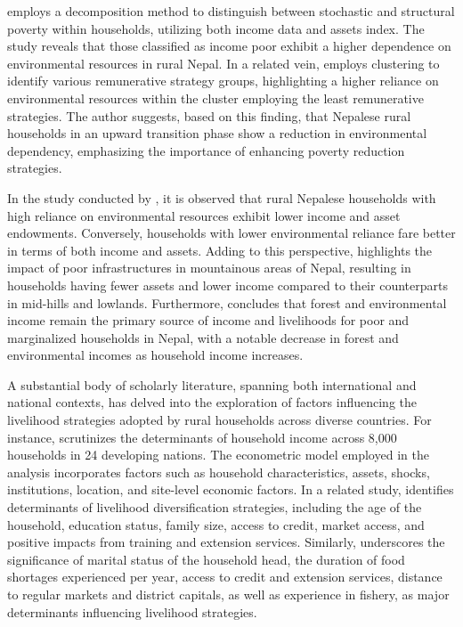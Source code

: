 \cite{charlery2015assessing} employs a decomposition method to distinguish between stochastic and structural poverty within households, utilizing both income data and assets index. The study reveals that those classified as income poor exhibit a higher dependence on environmental resources in rural Nepal. In a related vein, \cite{walelign2017dynamics} employs clustering to identify various remunerative strategy groups, highlighting a higher reliance on environmental resources within the cluster employing the least remunerative strategies. The author suggests, based on this finding, that Nepalese rural households in an upward transition phase show a reduction in environmental dependency, emphasizing the importance of enhancing poverty reduction strategies. 

In the study conducted by \cite{walelign2020environmental}, it is observed that rural Nepalese households with high reliance on environmental resources exhibit lower income and asset endowments. Conversely, households with lower environmental reliance fare better in terms of both income and assets. Adding to this perspective, \cite{walelign2021poverty} highlights the impact of poor infrastructures in mountainous areas of Nepal, resulting in households having fewer assets and lower income compared to their counterparts in mid-hills and lowlands. Furthermore, \cite{chhetri2022importance} concludes that forest and environmental income remain the primary source of income and livelihoods for poor and marginalized households in Nepal, with a notable decrease in forest and environmental incomes as household income increases.

A substantial body of scholarly literature, spanning both international and national contexts, has delved into the exploration of factors influencing the livelihood strategies adopted by rural households across diverse countries. For instance, \cite{angelsen2014environmental} scrutinizes the determinants of household income across 8,000 households in 24 developing nations. The econometric model employed in the analysis incorporates factors such as household characteristics, assets, shocks, institutions, location, and site-level economic factors. In a related study, \cite{emeru2022determinants} identifies determinants of livelihood diversification strategies, including the age of the household, education status, family size, access to credit, market access, and positive impacts from training and extension services. Similarly, \cite{amevenku2019determinants} underscores the significance of marital status of the household head, the duration of food shortages experienced per year, access to credit and extension services, distance to regular markets and district capitals, as well as experience in fishery, as major determinants influencing livelihood strategies.

